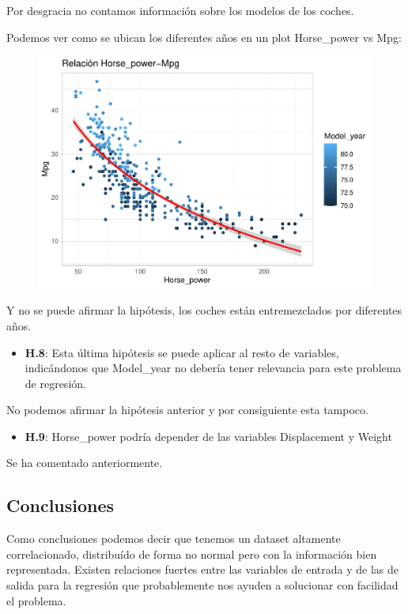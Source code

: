 Por desgracia no contamos información sobre los modelos de los coches.

\vspace{\baselineskip}

Podemos ver como se ubican los diferentes años en un plot Horse\_power vs Mpg:

\begin{figure}[H]\includegraphics[width=.9\linewidth]{img/EDA_files/figure-latex/unnamed-chunk-33-1} \caption{}\end{figure}

Y no se puede afirmar la hipótesis, los coches están entremezclados por diferentes años.

\begin{itemize}
\item \textbf{H.8}: Esta última hipótesis se puede aplicar al resto de variables, indicándonos que Model\_year no debería tener relevancia para este problema de regresión.
\end{itemize}

No podemos afirmar la hipótesis anterior y por consiguiente esta tampoco.

\begin{itemize}
\item \textbf{H.9}: Horse\_power podría depender de las variables Displacement y Weight
\end{itemize}

Se ha comentado anteriormente.

\subsection{Conclusiones}

Como conclusiones podemos decir que tenemos un dataset altamente correlacionado, distribuído de forma no normal pero con la información bien representada. Existen relaciones fuertes entre las variables de entrada y de las de salida para la regresión que probablemente nos ayuden a solucionar con facilidad el problema.

